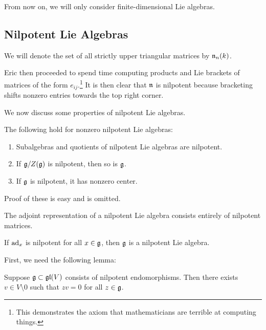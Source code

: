 \documentclass[twoside, 10pt]{article}
\begin{document}
    \begin{rmk} From now on, we will only consider finite-dimensional Lie
    algebras.  \end{rmk}
    
    \subsection{Nilpotent Lie Algebras}%
    
    
    \begin{notn} We will denote the set of all strictly upper triangular
    matrices by $\mathfrak{n}_n(k)$.  \end{notn}

    Eric then proceeded to spend time computing products and Lie brackets of
    matrices of the form $e_{ij}$.\footnote{This demonstrates the axiom that
    mathematicians are terrible at computing things.} It is then clear that
    $\mathfrak{n}$ is nilpotent because bracketing shifts nonzero entries towards the
    top right corner.

    We now discuss some properties of nilpotent Lie algebras.

    \begin{prop} The following hold for nonzero nilpotent Lie algebras:
        \begin{enumerate} \item Subalgebras and quotients of nilpotent Lie
            algebras are nilpotent.  \item If $\mathfrak{g}/Z(\mathfrak{g})$ is nilpotent,
            then so is $\mathfrak{g}$.  \item If $\mathfrak{g}$ is nilpotent, it has
            nonzero center.  \end{enumerate} \end{prop}

    Proof of these is easy and is omitted.

    \begin{rmk} The adjoint representation of a nilpotent Lie algebra consists
    entirely of nilpotent matrices.  \end{rmk}

    \begin{thm}[Engel] If $\operatorname{ad}_x$ is nilpotent for all $x \in \mathfrak{g}$, then
    $\mathfrak{g}$ is a nilpotent Lie algebra.  \end{thm}

    First, we need the following lemma:

    \begin{lem} Suppose $\mathfrak{g} \subset \mathfrak{gl}(V)$ consists of nilpotent
    endomorphisms. Then there exists $v \in V \setminus 0$ such that $zv = 0$
for all $z \in \mathfrak{g}$.  \end{lem}
\end{document}

